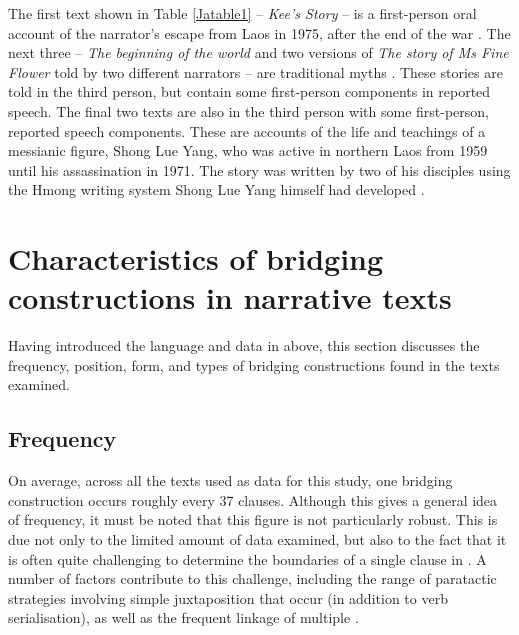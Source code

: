 \documentclass[output=paper]{LSP/langsci}
\begin{document}
The first text shown in Table \ref{Jatable1} -- \textit{Kee’s Story} -- is a first-person oral account of the narrator’s escape from Laos in 1975, after the end of the war \citep[][225--235]{fuller85}. The next three -- \textit{The beginning of the world} and two versions of \textit{The story of Ms Fine Flower} told by two different narrators -- are traditional  myths \citep[][3--13, 120--140, 161--168]{johnson92}. These stories are told in the third person, but contain some first-person components in reported speech. The final two texts are also in the third person with some first-person, reported speech components. These are accounts of the life and teachings of a messianic figure, Shong Lue Yang, who was active in northern Laos from 1959 until his assassination in 1971. The story was written by two of his disciples using the Hmong writing system Shong Lue Yang himself had developed \citep[][11--37]{vang90}.

%
\section{Characteristics of bridging constructions in narrative texts} 
\label{Jasec:Characteristics}

Having introduced the language and data in  above, this section discusses the frequency, position, form, and types of bridging constructions found in the texts examined.
%
\subsection{Frequency}
\label{JaFrequency}
On average, across all the texts used as data for this study, one bridging construction occurs roughly every 37 clauses. Although this gives a general idea of frequency, it must be noted that this figure is not particularly robust. This is due not only to the limited amount of data examined, but also to the fact that it is often quite challenging to determine the boundaries of a single clause in . A number of factors contribute to this challenge, including the range of paratactic strategies involving simple juxtaposition that occur (in addition to verb serialisation), as well as the frequent linkage of multiple  \citep[][183--186, 237--241]{jarkey15}.
\end{document}
